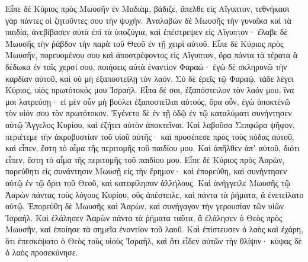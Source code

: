 {Εἶπε δὲ Κύριος πρὸς Μωυσῆν ἐν Μαδιὰμ, βάδιζε, ἄπελθε εἰς Αἴγυπτον, τεθνήκασι γὰρ πάντες οἱ ζητοῦντες σου τὴν ψυχήν.
Ἀναλαβὼν δὲ Μωυσῆς τὴν γυναῖκα καὶ τὰ παιδία, ἀνεβίβασεν αὐτὰ ἐπὶ τὰ ὑποζύγια, καὶ ἐπέστρεψεν εἰς Αἴγυπτον· ἔλαβε δὲ Μωυσῆς τὴν ῥάβδον τὴν παρὰ τοῦ Θεοῦ ἐν τῇ χειρὶ αὐτοῦ.
Εἶπε δὲ Κύριος πρὸς Μωυσῆν, πορευομένου σου καὶ ἀποστρέφοντος εἰς Αἴγυπτον, ὅρα πάντα τὰ τέρατα ἃ δέδωκα ἐν ταῖς χερσί σου, ποιήσεις αὐτὰ ἐναντίον Φαραώ· ἐγὼ δὲ σκληρυνῶ τὴν καρδίαν αὐτοῦ, καὶ οὐ μὴ ἐξαποστείλῃ τὸν λαόν.
Σὺ δὲ ἐρεῖς τῷ Φαραῴ, τάδε λέγει Κύριος, υἱὸς πρωτότοκός μου Ἰσραήλ.
Εἶπα δέ σοι, ἐξαπόστειλον τὸν λαόν μου, ἵνα μοι λατρεύσῃ· εἰ μὲν οὖν μὴ βούλει ἐξαποστεῖλαι αὐτούς, ὅρα οὖν, ἐγὼ ἀποκτένῶ τὸν υἱόν σου τὸν πρωτότοκον.
Ἐγένετο δὲ ἐν τῇ ὁδῷ ἐν τῷ καταλύματι συνήντησεν αὐτῷ Ἄγγελος Κυρίου, καὶ ἐζήτει αὐτὸν ἀποκτεῖναι.
Καὶ λαβοῦσα Σεπφώρα ψῆφον, περιέτεμε τὴν ἀκροβυστίαν τοῦ υἱοῦ αὐτῆς· καὶ προσέπεσε πρὸς τοὺς πόδας αὐτοῦ, καὶ εἶπεν, ἔστη τὸ αἷμα τῆς περιτομῆς τοῦ παιδίου μου.
Καὶ ἀπῆλθεν ἀπʼ αὐτοῦ, διότι εἶπεν, ἔστη τὸ αἷμα τῆς περιτομῆς τοῦ παιδίου μου.
Εἶπε δὲ Κύριος πρὸς Ἀαρὼν, πορεύθητι εἰς συνάντησιν Μωυσῇ εἰς τὴν ἔρημον· καὶ ἐπορεύθη, καὶ συνήντησεν αὐτῷ ἐν τῷ ὄρει τοῦ Θεοῦ, καὶ κατεφίλησαν ἀλλήλους.
Καὶ ἀνήγγειλε Μωυσῆς τῷ Ἀαρὼν πάντας τοὺς λόγους Κυρίου, οὓς ἀπέστειλε, καὶ πάντα τὰ ῥήματα, ἃ ἐνετείλατο αὐτῷ.
Ἐπορεύθη δὲ Μωυσῆς καὶ Ἀαρὼν, καὶ συνήγαγον τὴν γερουσίαν τῶν υἱῶν Ἰσραήλ.
Καὶ ἐλάλησεν Ἀαρὼν πάντα τὰ ῥήματα ταῦτα, ἃ ἐλάλησεν ὁ Θεὸς πρὸς Μωυσῆν, καὶ ἐποίησε τὰ σημεῖα ἐναντίον τοῦ λαοῦ.
Καὶ ἐπίστευσεν ὁ λαὸς καὶ ἐχάρη, ὅτι ἐπεσκέψατο ὁ Θεὸς τοὺς υἱοὺς Ἰσραὴλ, καὶ ὅτι εἶδεν αὐτῶν τὴν θλίψιν· κύψας δὲ ὁ λαὸς προσεκύνησε.

}
